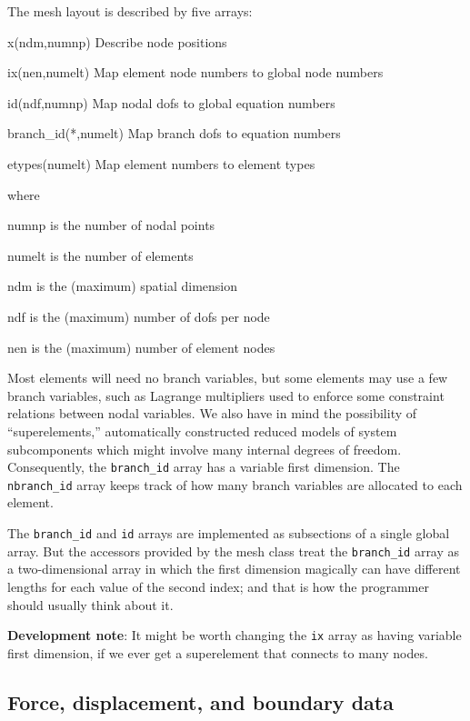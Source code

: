 \documentclass{article}
\newcommand{\devnote}[1]{%
  \begin{trivlist}
  \item\textbf{Development note}: #1
  \end{trivlist}}
\newenvironment{codelist}[1][\quad]%
  {\begin{list}{}{%
   \settowidth{\labelwidth}{\texttt{#1}\hfil}%
   \setlength{\leftmargin}{\labelwidth}%
   \addtolength{\leftmargin}{\labelsep}%
   \addtolength{\leftmargin}{\parindent}%
   \renewcommand{\makelabel}[1]{\texttt{##1}}}}%
  {\end{list}}
\newcommand{\ttt}[1]{\texttt{#1}}
\begin{document}
The mesh layout is described by five arrays:
\begin{codelist}[branch\_id(*,numelt)]
  \item[x(ndm,numnp)]     Describe node positions
  \item[ix(nen,numelt)]   Map element node numbers to global node numbers
  \item[id(ndf,numnp)]    Map nodal dofs to global equation numbers
  \item[branch\_id(*,numelt)]   Map branch dofs to equation numbers
  \item[etypes(numelt)]   Map element numbers to element types
\end{codelist}
where
\begin{codelist}[numelt]
  \item[numnp] is the number of nodal points
  \item[numelt] is the number of elements
  \item[ndm] is the (maximum) spatial dimension
  \item[ndf] is the (maximum) number of dofs per node
  \item[nen] is the (maximum) number of element nodes
\end{codelist}

Most elements will need no branch variables, but some elements may
use a few branch variables, such as Lagrange multipliers used to
enforce some constraint relations between nodal variables.  We also
have in mind the possibility of ``superelements,'' automatically
constructed reduced models of system subcomponents which might involve
many internal degrees of freedom.  Consequently, the
\ttt{branch\_id} array has a variable first dimension.  The
\ttt{nbranch\_id} array keeps track of how many branch variables are
allocated to each element.

The \ttt{branch\_id} and \ttt{id} arrays are implemented as
subsections of a single global array.  But the accessors provided by
the mesh class treat the \ttt{branch\_id} array as a
two-dimensional array in which the first dimension magically can have
different lengths for each value of the second index; and that is how
the programmer should usually think about it.

\devnote{It might be worth changing the \ttt{ix} array as having
  variable first dimension, if we ever get a superelement that
  connects to many nodes.}


\subsection{Force, displacement, and boundary data}
\end{document}
